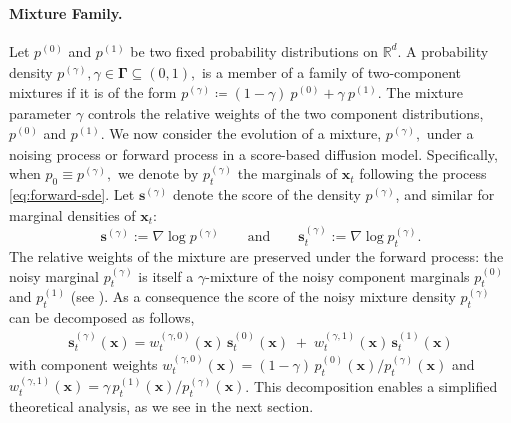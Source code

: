 \documentclass[11pt]{article}
\newcommand{\becca}[1]{\textcolor{dkred}{[becca: #1]}}
\newcommand{\vect}[1]{\mathbf{#1}}
\theoremstyle{plain}
\newcommand{\1}{\mathbbm{1}}
\newcommand{\vx}{\vect{x}}
\newcommand{\pdist}[2][]{p_{#1}^{(#2)}}
\newcommand{\score}[2][]{\vect{s}_{#1}^{(#2)}}
\begin{document}
\paragraph{Mixture Family.}
Let $\pdist{0}$ and $\pdist{1}$ be two fixed probability distributions on $\mathbb{R}^d$. A probability density $\pdist{\gamma}, \gamma \in \bm{\Gamma} \subseteq (0,1),$ is a member of a family of two-component mixtures if it is of the form $\pdist{\gamma}\coloneqq (1-\gamma)\: \pdist{0} + \gamma \:\pdist{1}$.
The mixture parameter $\gamma$ controls the relative weights of the two component distributions, $\pdist{0}$ and $\pdist{1}$. We now consider the evolution of a mixture, $\pdist{\gamma},$ under a noising process or forward process in a score-based diffusion model. 
Specifically, when $p_0 \equiv \pdist{\gamma},$ we denote by $\pdist[t]{\gamma}$ the marginals of $\vx_t$ following the process \eqref{eq:forward-sde}. Let $\score{\gamma}$ denote the {score} of the density $\pdist{\gamma}$, and similar for marginal densities of $\vx_t$:
\begin{equation}\label{eq:score-and-noisyscore}
  \score{\gamma} := \nabla \log \pdist{\gamma} \qquad \text{and} \qquad \score[t]{\gamma} := \nabla \log \pdist[t]{\gamma}.  
\end{equation}
The relative weights of the mixture are preserved under the forward process: the noisy marginal $\pdist[t]{\gamma}$ is itself a $\gamma$-mixture of the noisy component marginals $\pdist[t]{0}$ and $\pdist[t]{1}$ (see ). 
As a consequence the score of the noisy mixture density $\pdist[t]{\gamma}$ can be decomposed as follows,
\begin{align}
\score[t]{\gamma}({\vx})
    = w_t^{(\gamma,0)}({\vx})\,\score[t]{0}({\vx}) \;+\; w_t^{(\gamma,1)}({\vx})\,\score[t]{1}({\vx})
    \label{eq:mix score}
\end{align}
with component weights $w_t^{(\gamma,0)}({\vx}) = (1-\gamma)\,\pdist[t]{0}({\vx})/\pdist[t]{\gamma}({\vx})$ and $w_t^{(\gamma,1)}({\vx}) = \gamma\,\pdist[t]{1}({\vx})/\pdist[t]{\gamma}({\vx})$.
This decomposition enables a simplified theoretical analysis, as we see in the next section. 
\end{document}
